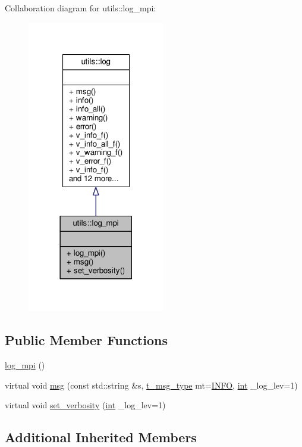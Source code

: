 Collaboration diagram for utils\-:\-:log\-\_\-mpi\-:
\nopagebreak
\begin{figure}[H]
\begin{center}
\leavevmode
\includegraphics[width=170pt]{classutils_1_1log__mpi__coll__graph}
\end{center}
\end{figure}
\subsection*{Public Member Functions}
\begin{DoxyCompactItemize}
\item 
\hyperlink{classutils_1_1log__mpi_ac8e1c08fee2cff9e537e19e4a7d81cbc}{log\-\_\-mpi} ()
\item 
virtual void \hyperlink{classutils_1_1log__mpi_a28c8d59f3d1a9082e774915c0885a4e2}{msg} (const std\-::string \&s, \hyperlink{classutils_1_1log_a295e2ee43d4e5ade12dd5de546cb1983}{t\-\_\-msg\-\_\-type} mt=\hyperlink{classutils_1_1log_a295e2ee43d4e5ade12dd5de546cb1983a34a1a7830fae0bde90731e751a1ed9c0}{I\-N\-F\-O}, \hyperlink{classint}{int} \-\_\-log\-\_\-lev=1)
\item 
virtual void \hyperlink{classutils_1_1log__mpi_aa0577a73c96f3b9f2b64ce4387e0d749}{set\-\_\-verbosity} (\hyperlink{classint}{int} \-\_\-log\-\_\-lev=1)
\end{DoxyCompactItemize}
\subsection*{Additional Inherited Members}


